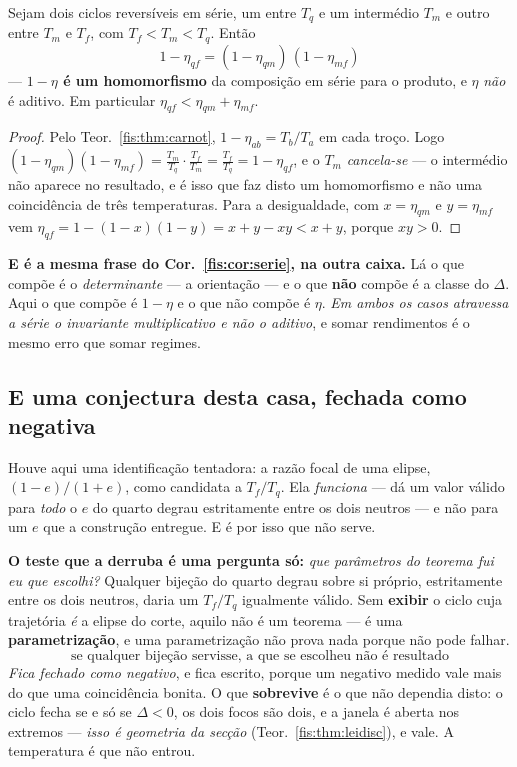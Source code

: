 \documentclass[livro.tex]{subfiles}
\begin{document}
\begin{corolario}\label{fis:cor:carnothom}
Sejam dois ciclos reversíveis em série, um entre $T_q$ e um intermédio $T_m$ e
outro entre $T_m$ e $T_f$, com $T_f<T_m<T_q$. Então
\[
\boxed{\;1-\eta_{qf}=(1-\eta_{qm})\,(1-\eta_{mf})\;}
\]
--- \textbf{$1-\eta$ é um homomorfismo} da composição em série para o produto, e
$\eta$ \emph{não} é aditivo. Em particular $\eta_{qf}<\eta_{qm}+\eta_{mf}$.
\end{corolario}

\begin{proof}
Pelo Teor.~\ref{fis:thm:carnot}, $1-\eta_{ab}=T_b/T_a$ em cada troço. Logo
$(1-\eta_{qm})(1-\eta_{mf})=\tfrac{T_m}{T_q}\cdot\tfrac{T_f}{T_m}=\tfrac{T_f}{T_q}
=1-\eta_{qf}$, e o $T_m$ \emph{cancela-se} --- o intermédio não aparece no
resultado, e é isso que faz disto um homomorfismo e não uma coincidência de três
temperaturas. Para a desigualdade, com $x=\eta_{qm}$ e $y=\eta_{mf}$ vem
$\eta_{qf}=1-(1-x)(1-y)=x+y-xy<x+y$, porque $xy>0$.
\end{proof}

\medskip\noindent\textbf{E é a mesma frase do Cor.~\ref{fis:cor:serie}, na outra
caixa.} Lá o que compõe é o \emph{determinante} --- a orientação --- e o que
\textbf{não} compõe é a classe do $\Delta$. Aqui o que compõe é $1-\eta$ e o que
não compõe é $\eta$. \emph{Em ambos os casos atravessa a série o invariante
multiplicativo e não o aditivo}, e somar rendimentos é o mesmo erro que somar
regimes.

\subsection*{E uma conjectura desta casa, fechada como negativa}
\noindent Houve aqui uma identificação tentadora: a razão focal de uma elipse,
$(1-e)/(1+e)$, como candidata a $T_f/T_q$. Ela \emph{funciona} --- dá um valor
válido para \emph{todo} o $e$ do quarto degrau estritamente entre os dois
neutros --- e não para um $e$ que a construção entregue. E é por isso que não
serve.

\medskip\noindent\textbf{O teste que a derruba é uma pergunta só:} \emph{que
parâmetros do teorema fui eu que escolhi?} Qualquer bijeção do quarto degrau
sobre si próprio, estritamente entre os dois neutros,
daria um $T_f/T_q$ igualmente válido. Sem \textbf{exibir} o ciclo cuja trajetória
\emph{é} a elipse do corte, aquilo não é um teorema --- é uma
\textbf{parametrização}, e uma parametrização não prova nada porque não pode
falhar.
\[
\boxed{\;\text{se qualquer bijeção servisse, a que se escolheu não é resultado}\;}
\]
\emph{Fica fechado como negativo}, e fica escrito, porque um negativo medido vale
mais do que uma coincidência bonita. O que \textbf{sobrevive} é o que não dependia
disto: o ciclo fecha se e só se $\Delta<0$, os dois focos são dois, e a janela é
aberta nos extremos --- \emph{isso é geometria da secção}
(Teor.~\ref{fis:thm:leidisc}), e vale. A temperatura é que não entrou.
\end{document}
